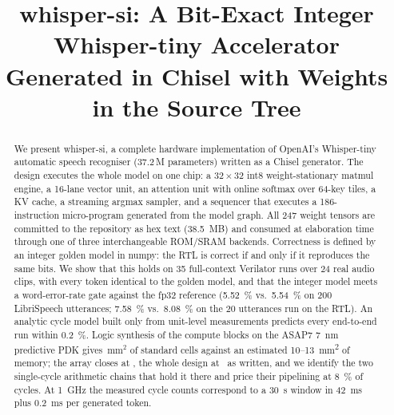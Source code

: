 \documentclass[conference]{IEEEtran}
\newcommand{\code}[1]{\texttt{#1}}
\begin{document}
\title{whisper-si: A Bit-Exact Integer Whisper-tiny Accelerator\\Generated in Chisel with Weights in the Source Tree}

\author{
\IEEEauthorblockA{\code{github.com/tibrewalrachit/wispr-on-chip}}}

\maketitle

\begin{abstract}
We present whisper-si, a complete hardware implementation of OpenAI's Whisper-tiny automatic speech recogniser (37.2\,M parameters) written as a Chisel generator. The design executes the whole model on one chip: a $32\times32$ int8 weight-stationary matmul engine, a 16-lane vector unit, an attention unit with online softmax over 64-key tiles, a KV cache, a streaming argmax sampler, and a sequencer that executes a 186-instruction micro-program generated from the model graph. All 247 weight tensors are committed to the repository as hex text (\SI{38.5}{MB}) and consumed at elaboration time through one of three interchangeable ROM/SRAM backends. Correctness is defined by an integer golden model in numpy: the RTL is correct if and only if it reproduces the same bits. We show that this holds on 35 full-context Verilator runs over 24 real audio clips, with every token identical to the golden model, and that the integer model meets a word-error-rate gate against the fp32 reference (\SI{5.52}{\percent} vs.\ \SI{5.54}{\percent} on 200 LibriSpeech utterances; \SI{7.58}{\percent} vs.\ \SI{8.08}{\percent} on the 20 utterances run on the RTL). An analytic cycle model built only from unit-level measurements predicts every end-to-end run within \SI{0.2}{\percent}. Logic synthesis of the compute blocks on the ASAP7 \SI{7}{nm} predictive PDK gives \areaLogicTotal\,mm$^2$ of standard cells against an estimated \SI{10}{}--\SI{13}{mm^2} of memory; the array closes at \fmaxSA, the whole design at \fmaxAll\ as written, and we identify the two single-cycle arithmetic chains that hold it there and price their pipelining at \SI{8}{\percent} of cycles. At \SI{1}{GHz} the measured cycle counts correspond to a \SI{30}{s} window in \SI{42}{ms} plus \SI{0.2}{ms} per generated token.
\end{abstract}
\end{document}
